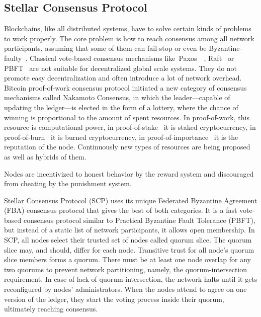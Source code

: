 \documentclass[applsci,article,submit,moreauthors,pdftex]{Definitions/mdpi}
\begin{document}
\subsection{Stellar Consensus Protocol}
Blockchains, like all distributed systems, have to solve certain kinds of problems to work properly. The core problem is how to reach consensus among all network participants, assuming that some of them can fail-stop or even be Byzantine-faulty~\cite{lamport2019byzantine}. Classical vote-based consensus mechanisms like~Paxos~\cite{lamport2019part}~\cite{lamport2001paxos}, Raft~\cite{ongaro2014search} or PBFT~\cite{castro1999practical} are not suitable for decentralized global scale systems. They do not promote easy decentralization and often introduce a lot of network overhead. Bitcoin proof-of-work consensus protocol initiated a new category of consensus mechanisms called Nakamoto Consensus, in which the leader––capable of updating the ledger––is elected in the form of a lottery, where the chance of winning is proportional to the amount of spent resources. In proof-of-work, this resource is computational power, in proof-of-stake~\cite{king2012ppcoin} it is staked cryptocurrency, in proof-of-burn~\cite{whitepap24:online} it is burned cryptocurrency, in proof-of-importance~\cite{NEMtechR25:online} it is the reputation of the node. Continuously new types of resources are being proposed as well as hybrids of them. 

Nodes are incentivized to honest behavior by the reward system and discouraged from cheating by the punishment system. 

Stellar Consensus Protocol (SCP) uses its unique Federated Byzantine Agreement (FBA) consensus protocol that gives the best of both categories. It is a fast vote-based consensus protocol similar to Practical Byzantine Fault Tolerance (PBFT), but instead of a static list of network participants, it allows open membership.
In SCP, all nodes select their trusted set of nodes called quorum slice. The quorum slice may, and should, differ for each node. Transitive trust for all node's quorum slice members forms a quorum. There must be at least one node overlap for any two quorums to prevent network partitioning, namely, the quorum-intersection requirement. In case of lack of quorum-intersection, the network halts until it gets reconfigured by nodes' administrators. When the nodes attend to agree on one version of the ledger, they start the voting process inside their quorum, ultimately reaching consensus.
\end{document}
